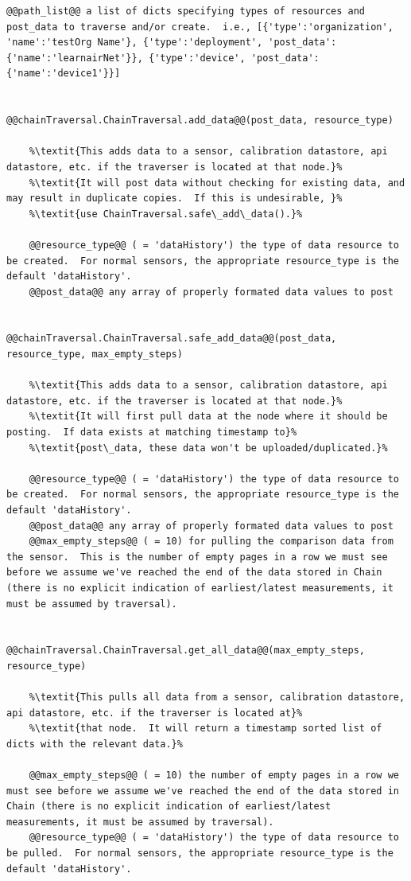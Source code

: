 \begin{lstlisting}[style=codedef]
	@@path_list@@ a list of dicts specifying types of resources and post_data to traverse and/or create.  i.e., [{'type':'organization', 'name':'testOrg Name'}, {'type':'deployment', 'post_data':{'name':'learnairNet'}}, {'type':'device', 'post_data':{'name':'device1'}}]


@@chainTraversal.ChainTraversal.add_data@@(post_data, resource_type)

	%\textit{This adds data to a sensor, calibration datastore, api datastore, etc. if the traverser is located at that node.}%
	%\textit{It will post data without checking for existing data, and may result in duplicate copies.  If this is undesirable, }%
	%\textit{use ChainTraversal.safe\_add\_data().}%  

	@@resource_type@@ ( = 'dataHistory') the type of data resource to be created.  For normal sensors, the appropriate resource_type is the default 'dataHistory'.
	@@post_data@@ any array of properly formated data values to post


@@chainTraversal.ChainTraversal.safe_add_data@@(post_data, resource_type, max_empty_steps)

	%\textit{This adds data to a sensor, calibration datastore, api datastore, etc. if the traverser is located at that node.}%
	%\textit{It will first pull data at the node where it should be posting.  If data exists at matching timestamp to}%
	%\textit{post\_data, these data won't be uploaded/duplicated.}%  

	@@resource_type@@ ( = 'dataHistory') the type of data resource to be created.  For normal sensors, the appropriate resource_type is the default 'dataHistory'.
	@@post_data@@ any array of properly formated data values to post
	@@max_empty_steps@@ ( = 10) for pulling the comparison data from the sensor.  This is the number of empty pages in a row we must see before we assume we've reached the end of the data stored in Chain (there is no explicit indication of earliest/latest measurements, it must be assumed by traversal).


@@chainTraversal.ChainTraversal.get_all_data@@(max_empty_steps, resource_type)

	%\textit{This pulls all data from a sensor, calibration datastore, api datastore, etc. if the traverser is located at}%
	%\textit{that node.  It will return a timestamp sorted list of dicts with the relevant data.}%

	@@max_empty_steps@@ ( = 10) the number of empty pages in a row we must see before we assume we've reached the end of the data stored in Chain (there is no explicit indication of earliest/latest measurements, it must be assumed by traversal).
	@@resource_type@@ ( = 'dataHistory') the type of data resource to be pulled.  For normal sensors, the appropriate resource_type is the default 'dataHistory'.

\end{lstlisting}



